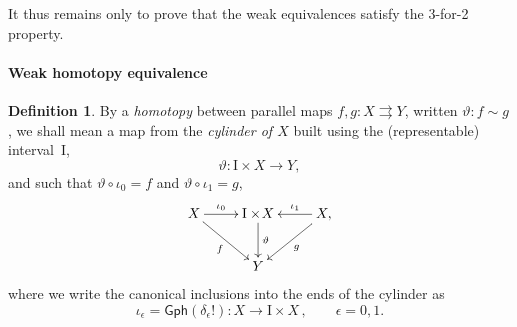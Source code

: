 \documentclass[11pt]{article}
\newcommand{\I}{\ensuremath{\mathrm{I}}}
\theoremstyle{remark}
\theoremstyle{definition}
\newtheorem{definition}[theorem]{Definition}
\begin{document}
It thus remains only to prove that the weak equivalences satisfy the 3-for-2 property.

\paragraph{Weak homotopy equivalence}

\begin{definition}\label{homotopy}
By a \emph{homotopy} between parallel maps $f, g: X\rightrightarrows Y$, written $\vartheta : f \sim g$,  we shall mean a map from the \emph{cylinder of $X$} built using the (representable) interval~$\I$,
\[
\vartheta : \I\times{X} \to Y,
\]
and such that $\vartheta \circ \iota_0 = f$ and $\vartheta \circ \iota_1 = g$, 
\begin{equation*}%
\xymatrix{
X \ar[r]^-{\iota_0} \ar[rd]_f & \I\times\!{X} \ar[d]^-{\vartheta} & X, \ar[l]_-{\iota_1} \ar[ld]^g \\
& Y &
}
\end{equation*}
where we write the canonical inclusions into the ends of the cylinder as
\[
\iota_\epsilon = \mathsf{Gph}(\delta_\epsilon!) : X\to \I\times X\,,\qquad \epsilon = 0,1 .
\]  

\end{definition}
\end{document}
